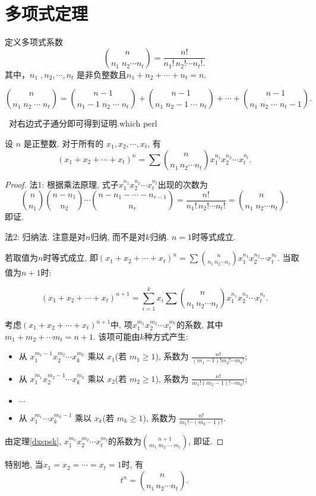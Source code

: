 \section{多项式定理}
定义多项式系数
\[
    \binom{n}{n_1\; n_2 \cdots n_t} = \frac{n!}{n_1! \, n_2! \cdots n_t!.}
\]
其中，\( n_1\;, n_2, \cdots, n_t \) 是非负整数且$n_1 + n_2 + \cdots + n_t = n$.

\begin{theorem}[多项式系数的帕斯卡公式]\label{dxspsk}
    $$\binom{n}{n_1 \; n_2 \; \cdots \; n_t} = \binom{n-1}{n_1-1 \; n_2 \; \cdots \; n_t} + \binom{n-1}{n_1 \; n_2-1 \; \cdots \; n_t} + \cdots + \binom{n-1}{n_1 \; n_2 \; \cdots \; n_t-1}.$$
\end{theorem}\
对右边式子通分即可得到证明.which perl

\begin{theorem}[多项式定理]
    设 \( n \) 是正整数.  对于所有的 \( x_1, x_2, \cdots, x_t \), 有
    \[
        (x_1 + x_2 + \cdots + x_t)^n = \sum \binom{n}{n_1 \, n_2 \cdots n_t} x_1^{n_1} x_2^{n_2} \cdots x_t^{n_t}.
    \]
\end{theorem}
\begin{proof}
    法1: 根据乘法原理, 式子$x_1^{n_1} x_2^{n_2} \cdots x_t^{n_t}$出现的次数为
    $$\binom{n}{n_1} \binom{n-n_1}{n_2} \cdots \binom{n-n_1-\cdots-n_{r-1}}{n_r}=\frac{n!}{n_1! \, n_2! \cdots n_t!}=\binom{n}{n_1\; n_2 \cdots n_t}.$$即证.

    法2: 归纳法. 注意是对$n$归纳, 而不是对$k$归纳. $n=1$时等式成立.

    若取值为$n$时等式成立, 即$(x_1 + x_2 + \cdots + x_t)^n = \sum \binom{n}{n_1 \, n_2 \cdots n_t} x_1^{n_1} x_2^{n_2} \cdots x_t^{n_t}.$ 当取值为$n+1$时:

    $$(x_1 + x_2 + \cdots + x_t)^{n+1} = \sum_{i=1}^{k}x_i  \sum \binom{n}{n_1 \, n_2 \cdots n_t} x_1^{n_1} x_2^{n_2} \cdots x_t^{n_t}.$$

    考虑$(x_1 + x_2 + \cdots + x_t)^{n+1}$中, 项$x_1^{m_1} x_2^{m_2} \cdots x_t^{m_t}$的系数, 其中$m_1+m_2+\cdots m_t=n+1$. 该项可能由$k$种方式产生:

    \begin{itemize}
        \item 从 \( x_1^{m_1 - 1} x_2^{m_2} \cdots x_k^{m_k} \) 乘以 \( x_1 \)(若 \( m_1 \geq 1 \)), 系数为 \( \frac{n!}{(m_1 - 1)! m_2! \cdots m_k!} \);
        \item 从 \( x_1^{m_1} x_2^{m_2 - 1} \cdots x_k^{m_k} \) 乘以 \( x_2 \)(若 \( m_2 \geq 1 \)), 系数为 \( \frac{n!}{m_1! (m_2 - 1)! \cdots m_k!} \);
        \item \(\cdots\)
        \item 从 \( x_1^{m_1} \cdots x_k^{m_k - 1} \) 乘以 \( x_k \)(若 \( m_k \geq 1 \)), 系数为 \( \frac{n!}{m_1! \cdots (m_k - 1)!} \).

    \end{itemize}

    由定理\ref{dxspsk}, $x_1^{m_1} x_2^{m_2} \cdots x_t^{m_t}$的系数为$\binom{n+1}{m_1 \; m_2 \; \cdots \; m_t}$, 即证.

\end{proof}

特别地, 当$x_1=x_2=\cdots=x_t=1$时, 有
$$t^n=\binom{n}{n_1 \, n_2 \cdots n_t}.$$
